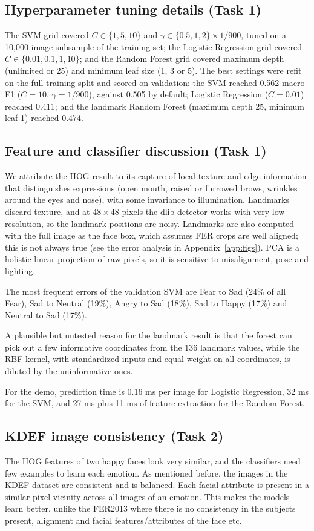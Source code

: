 \FloatBarrier
\subsection{Hyperparameter tuning details (Task 1)}
\label{app:tuning}
The SVM grid covered $C \in \{1, 5, 10\}$ and $\gamma \in \{0.5, 1, 2\} \times 1/900$, tuned on a 10,000-image subsample of the training set; the Logistic Regression grid covered $C \in \{0.01, 0.1, 1, 10\}$; and the Random Forest grid covered maximum depth (unlimited or 25) and minimum leaf size (1, 3 or 5). The best settings were refit on the full training split and scored on validation: the SVM reached 0.562 macro-F1 ($C = 10$, $\gamma = 1/900$), against 0.505 by default; Logistic Regression ($C = 0.01$) reached 0.411; and the landmark Random Forest (maximum depth 25, minimum leaf 1) reached 0.474.

\FloatBarrier
\subsection{Feature and classifier discussion (Task 1)}
\label{app:feature-discussion}
We attribute the HOG result to its capture of local texture and edge information that distinguishes expressions (open mouth, raised or furrowed brows, wrinkles around the eyes and nose), with some invariance to illumination. Landmarks discard texture, and at $48\times48$ pixels the dlib detector works with very low resolution, so the landmark positions are noisy. Landmarks are also computed with the full image as the face box, which assumes FER crops are well aligned; this is not always true (see the error analysis in Appendix~\ref{app:figs}). PCA is a holistic linear projection of raw pixels, so it is sensitive to misalignment, pose and lighting.

The most frequent errors of the validation SVM are Fear to Sad (24\% of all Fear), Sad to Neutral (19\%), Angry to Sad (18\%), Sad to Happy (17\%) and Neutral to Sad (17\%).

A plausible but untested reason for the landmark result is that the forest can pick out a few informative coordinates from the 136 landmark values, while the RBF kernel, with standardized inputs and equal weight on all coordinates, is diluted by the uninformative ones.

For the demo, prediction time is 0.16 ms per image for Logistic Regression, 32 ms for the SVM, and 27 ms plus 11 ms of feature extraction for the Random Forest.

\FloatBarrier
\subsection{KDEF image consistency (Task 2)}
\label{app:kdef-consistency}
The HOG features of two happy faces look very similar, and the classifiers need few examples to learn each emotion. As mentioned before, the images in the KDEF dataset are consistent and is balanced. Each facial attribute is present in a similar pixel vicinity across all images of an emotion. This makes the models learn better, unlike the FER2013 where there is no consistency in the subjects present, alignment and facial features/attributes of the face etc.

